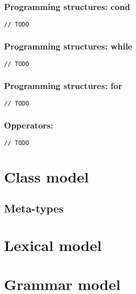 \documentclass[11pt]{beamer}
\begin{document}
\begin{frame}[fragile]
\frametitle{Programming structures: cond}
\begin{lstlisting}[language=lekta]
// TODO
\end{lstlisting}
\end{frame}

\begin{frame}[fragile]
\frametitle{Programming structures: while}
\begin{lstlisting}[language=lekta]
// TODO
\end{lstlisting}
\end{frame}

\begin{frame}[fragile]
\frametitle{Programming structures: for}
\begin{lstlisting}[language=lekta]
// TODO
\end{lstlisting}
\end{frame}

\begin{frame}[fragile]
\frametitle{Opperators:}
\begin{lstlisting}[language=lekta]
// TODO
\end{lstlisting}
\end{frame}

\begin{frame}
\end{frame}

\section{Class model}

\begin{frame}
\end{frame}

\subsection{Meta-types}

\begin{frame}
\end{frame}

\section{Lexical model}

\begin{frame}
\end{frame}

\section{Grammar model}
\end{document}
